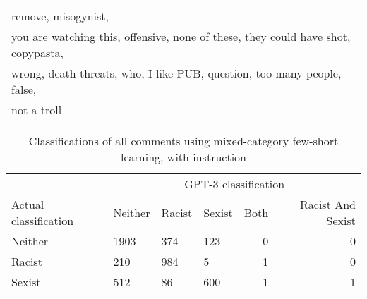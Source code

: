 \documentclass{bmcart}
\begin{document}
\begin{backmatter}
\begin{table}
\begin{tabular}[t]{l}
remove,  misogynist, \\ you are watching this,  offensive,  none of these,  they could have shot,  copypasta, \\ wrong,  death threats,  who,  I like PUB,  question,  too many people,  false, \\ not a troll\\
\hline
\end{tabular}
\end{table}









\begin{table}

\caption{\label{tab:fewshotmixedinstruct-matrix}Classifications of all comments using mixed-category few-short learning, with instruction}
\centering
\begin{tabular}[t]{llllrr}
\hline
\multicolumn{1}{c}{ } & \multicolumn{5}{c}{GPT-3 classification} \\
Actual classification & Neither & Racist & Sexist & Both & Racist And Sexist\\
\hline
Neither & 1903 & 374 & 123 & 0 & 0\\
Racist & 210 & 984 & 5 & 1 & 0\\
Sexist & 512 & 86 & 600 & 1 & 1\\
\hline
\end{tabular}
\end{table}













\begin{table}


\end{table}
\end{backmatter}
\end{document}
